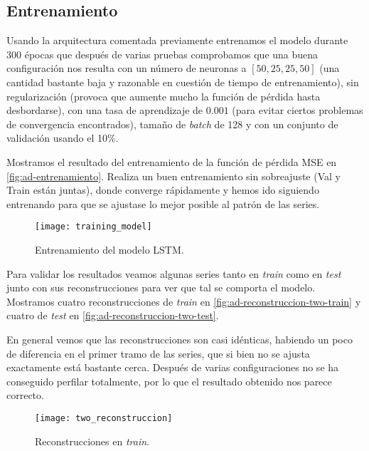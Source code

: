 \subsection{Entrenamiento}

Usando la arquitectura comentada previamente entrenamos el modelo durante 300 épocas que después de varias pruebas comprobamos que una buena configuración nos resulta con un número de neuronas a $[50, 25, 25, 50]$ (una cantidad bastante baja y razonable en cuestión de tiempo de entrenamiento), sin regularización (provoca que aumente mucho la función de pérdida hasta desbordarse), con una tasa de aprendizaje de $0.001$ (para evitar ciertos problemas de convergencia encontrados), tamaño de \emph{batch} de 128 y con un conjunto de validación usando el 10\%.

Mostramos el resultado del entrenamiento de la función de pérdida MSE en \autoref{fig:ad-entrenamiento}. Realiza un buen entrenamiento sin sobreajuste (Val y Train están juntas), donde converge rápidamente y hemos ido siguiendo entrenando para que se ajustase lo mejor posible al patrón de las series.

\begin{figure}[htpb]
  \centering
  \texttt{[image: training\_model]}
  \caption{Entrenamiento del modelo LSTM.}
  \label{fig:ad-entrenamiento}
\end{figure}

Para validar los resultados veamos algunas series tanto en \emph{train} como en \emph{test} junto con sus reconstrucciones para ver que tal se comporta el modelo.
Mostramos cuatro reconstrucciones de \emph{train} en \autoref{fig:ad-reconstruccion-two-train} y cuatro de \emph{test} en \autoref{fig:ad-reconstruccion-two-test}.

En general vemos que las reconstrucciones son casi idénticas, habiendo un poco de diferencia en el primer tramo de las series, que si bien no se ajusta exactamente está bastante cerca. Después de varias configuraciones no se ha conseguido perfilar totalmente, por lo que el resultado obtenido nos parece correcto.

\begin{figure}[htpb]
  \centering
  \texttt{[image: two\_reconstruccion]}
  \caption{Reconstrucciones en \emph{train}.}
  \label{fig:ad-reconstruccion-two-train}
\end{figure}

